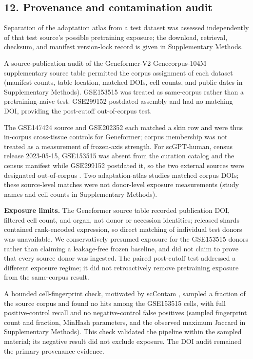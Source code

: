 \documentclass[12pt,letterpaper]{article}
\begin{document}
\subsection*{12. Provenance and contamination audit}

Separation of the adaptation atlas from a test dataset was assessed independently of that test source's possible pretraining exposure; the download, retrieval, checksum, and manifest version-lock record is given in Supplementary Methods.

A source-publication audit of the Geneformer-V2 Genecorpus-104M supplementary source table permitted the corpus assignment of each dataset (manifest counts, table location, matched DOIs, cell counts, and public dates in Supplementary Methods). GSE153515 was treated as same-corpus rather than a pretraining-naive test. GSE299152 \cite{gse299152} postdated assembly and had no matching DOI, providing the post-cutoff out-of-corpus test.

The GSE147424 source \cite{he2020epidermis} and GSE202352 \cite{wiedemann2023} each matched a skin row and were thus in-corpus cross-tissue controls for Geneformer; corpus membership was not treated as a measurement of frozen-axis strength. For scGPT-human, census release 2023-05-15, GSE153515 was absent from the curation catalog and the census manifest while GSE299152 postdated it, so the two external sources were designated out-of-corpus \cite{cui2024scgpt}. Two adaptation-atlas studies matched corpus DOIs; these source-level matches were not donor-level exposure measurements (study names and cell counts in Supplementary Methods).

\textbf{Exposure limits.} The Geneformer source table recorded publication DOI, filtered cell count, and organ, not donor or accession identities; released shards contained rank-encoded expression, so direct matching of individual test donors was unavailable. We conservatively presumed exposure for the GSE153515 donors rather than claiming a leakage-free frozen baseline, and did not claim to prove that every source donor was ingested. The paired post-cutoff test addressed a different exposure regime; it did not retroactively remove pretraining exposure from the same-corpus result.

A bounded cell-fingerprint check, motivated by scContam \cite{sccontam2026}, sampled a fraction of the source corpus and found no hits among the GSE153515 cells, with full positive-control recall and no negative-control false positives (sampled fingerprint count and fraction, MinHash parameters, and the observed maximum Jaccard in Supplementary Methods). This check validated the pipeline within the sampled material; its negative result did not exclude exposure. The DOI audit remained the primary provenance evidence.
\end{document}
